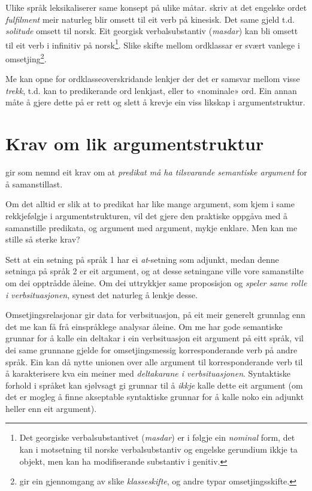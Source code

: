 \documentclass[11pt,a4paper,oneside,draft]{book}
\begin{document}
Ulike språk leksikaliserer same konsept på ulike
måtar. \citet[s.~3]{cheung2002scg} skriv at det engelske ordet
\emph{fulfilment} meir naturleg blir omsett til eit verb på kinesisk. Det
same gjeld t.d. \emph{solitude} omsett til norsk. Eit georgisk
verbalsubstantiv (\emph{masdar}) kan bli omsett til eit verb i infinitiv på
norsk\footnote{Det georgiske verbalsubstantivet (\emph{masdar}) er i følgje
        \citet[kap.~2.5]{aronson1990grg} ein \emph{nominal} form, det kan i
        motsetning til norske verbalsubstantiv og engelske gerundium
        ikkje ta objekt, men kan ha modifiserande substantiv i
        genitiv. }. Slike skifte mellom ordklassar er svært vanlege i
omsetjing\footnote{\citet[Catford~(1965),~i][s.~61]{munday2001its} gir ein gjennomgang av
slike \emph{klasseskifte}, og andre typar omsetjingsskifte. }.

Me kan opne for ordklasseoverskridande lenkjer der det er samsvar
mellom visse \emph{trekk}, t.d. kan to predikerande ord lenkjast, eller to
«nominale» ord. Ein annan måte å gjere dette på er rett og slett å
krevje ein viss likskap i argumentstruktur. 


\section{Krav om lik argumentstruktur}
\label{sec-3.15}

\label{SEC:lik-argstr}

\citet{thunes2003eal} gir som nemnd eit krav om at \emph{predikat må ha tilsvarande semantiske argument} for å samanstillast.

Om det alltid er slik at to predikat har like mange argument, som kjem i
same rekkjefølgje i argumentstrukturen, vil det gjere den praktiske
oppgåva med å samanstille predikata, og argument med argument, mykje
enklare. Men kan me stille så sterke krav?

Sett at ein setning på språk 1 har ei \emph{at}-setning som adjunkt, medan
denne setninga på språk 2 er eit argument, og at desse setningane
ville vore samanstilte om dei opptrådde åleine. Om dei uttrykkjer same
proposisjon og \emph{speler same rolle i verbsituasjonen},
synest det naturleg å lenkje desse.  

Omsetjingsrelasjonar gir data for verbsituasjon, på eit meir generelt
grunnlag enn det me kan få frå einspråklege analysar åleine. Om me har
gode semantiske grunnar for å kalle ein deltakar i ein verbsituasjon
eit argument på eitt språk, vil dei same grunnane gjelde for
omsetjingsmessig korresponderande verb på andre språk. Ein kan då
nytte unionen over alle argument til korresponderande verb til å
karakterisere kva ein meiner med \emph{deltakarane i verbsituasjonen}. Syntaktiske forhold i språket kan sjølvsagt gi
grunnar til å \emph{ikkje} kalle dette eit argument (om det er mogleg å
finne akseptable syntaktiske grunnar for å kalle noko ein adjunkt
heller enn eit argument).
 
\end{document}
